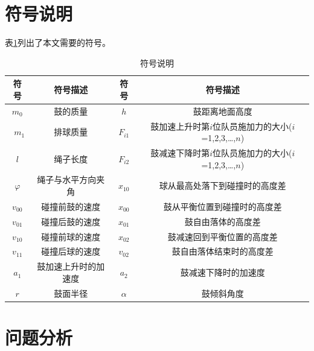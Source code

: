 \documentclass{cumcm}
\begin{document}
\section{符号说明}
表\ref{table-symbol}列出了本文需要的符号。
\begin{table}[H]
  \centering
  \caption{符号说明}\label{table-symbol}
  \begin{tabular*}{\textwidth}{c|c|c|c}
  \hline
  符号 & 符号描述 & 符号 & 符号描述\\
  \hline
  $m_0$ & 鼓的质量 & $h$ & 鼓距离地面高度\\\
  $m_1$ & 排球质量 & $F_{i1}$ & 鼓加速上升时第$i$位队员施加力的大小($i$=1,2,3,\dots,$n$)\\
  $l$ & 绳子长度& $F_{i2}$ & 鼓减速下降时第$i$位队员施加力的大小($i$=1,2,3,\dots,$n$)\\
  $\varphi$ & 绳子与水平方向夹角 & $x_{10}$ & 球从最高处落下到碰撞时的高度差\\
  $v_{00}$ & 碰撞前鼓的速度 &  $x_{00}$ & 鼓从平衡位置到碰撞时的高度差\\
  $v_{01}$ & 碰撞后鼓的速度 &  $x_{01}$ & 鼓自由落体的高度差\\
  $v_{10}$ & 碰撞前球的速度 & $x_{02}$ & 鼓减速回到平衡位置的高度差\\
  $v_{11}$ & 碰撞后球的速度 & $v_{02}$ & 鼓自由落体结束时的高度差\\
  $a_1$ & 鼓加速上升时的加速度 & $a_2$ & 鼓减速下降时的加速度\\
  $r$ & 鼓面半径 & $\alpha$ & 鼓倾斜角度\\
  \hline
  \end{tabular*}
\end{table}


\section{问题分析}
\end{document}
